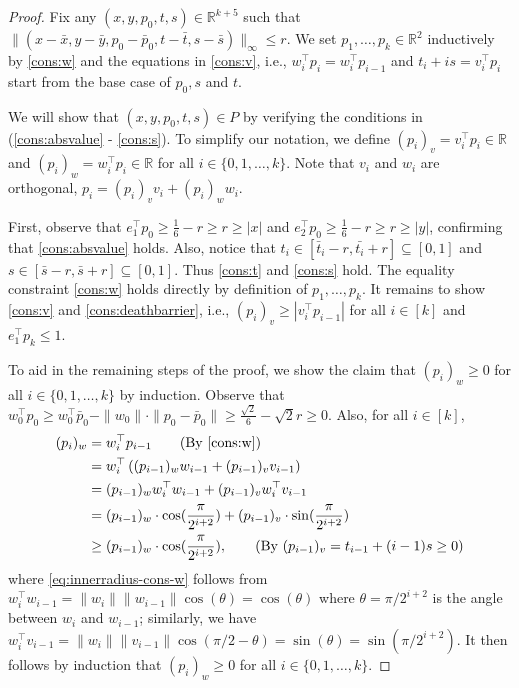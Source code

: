 \documentclass{article}\usepackage[a4paper,margin=20mm]{geometry}
\newcommand{\R}{\mathbb R}
\renewcommand{\subset}{\subseteq}
\begin{document}
\begin{proof}
    Fix any $(x, y, p_0, t, s) \in \R^{k + 5}$ such that $\|(x - \bar{x}, y - \bar{y}, p_0 - \bar{p}_0, t - \bar{t}, s - \bar{s})\|_\infty \leq r$. 
    We set $p_1, \ldots, p_k \in \R^2$ inductively by \eqref{cons:w} and the equations in \eqref{cons:v}, i.e.,
    $w_i^\top p_i = w_i^\top p_{i-1} $ and $t_i + is = v_i^\top p_i $ start from the base case of $p_0, s$ and $t$. 
    
    We will show that $(x, y, p_0, t, s) \in P$ by verifying the conditions in (\ref{cons:absvalue} - \ref{cons:s}).
    To simplify our notation, we define $(p_i)_v = v_i^\top p_i \in \R$ and $(p_i)_w = w_i^\top p_i \in \R$ for all $i \in \{0, 1, \ldots, k\}$. Note that $v_i$ and $w_i$ are orthogonal, $p_i = (p_i)_v v_i + (p_i)_w w_i$.
    
    First, observe that $e_1^\top p_0 \geq \frac{1}{6} - r \geq r \geq |x|$ and $e_2^\top p_0 \geq \frac{1}{6} - r \geq r \geq |y|$, confirming that \eqref{cons:absvalue} holds.
    Also, notice that $t_i \in [\bar{t}_i - r, \bar{t_i} + r] \subset [0, 1]$
     and $s \in [\bar{s} - r, \bar{s} + r] \subset [0, 1]$. Thus \eqref{cons:t} and \eqref{cons:s} hold. 
    The equality constraint \eqref{cons:w} holds directly by definition of $p_1,\ldots, p_k$.
    It remains to show \eqref{cons:v} and \eqref{cons:deathbarrier}, i.e., $ (p_i)_v \geq |v_i^\top p_{i-1}|$ for all $i \in [k]$ and $e_1^\top p_k \leq 1$.
    
    To aid in the remaining steps of the proof, we show the claim that $(p_i)_w \geq 0$
    for all $i \in \{0,1,\ldots,k\}$ by induction. Observe that
    $w_0^\top p_0 \geq w_0^\top \bar{p}_0 - \|w_0\|\cdot\|p_0 - \bar p_0\| \geq \frac{\sqrt{2}}{6} - \sqrt 2 r \geq 0$.
    Also, for all $i \in [k]$,
    \begin{align}
        (p_i)_w &= w_i^\top p_{i-1} \tag{By \eqref{cons:w}} \nonumber \\
        &= w_i^\top \left( (p_{i-1})_w w_{i-1} + (p_{i-1})_v v_{i-1} \right) \nonumber \\
        &= (p_{i-1})_w w_i^\top w_{i-1} + (p_{i-1})_v w_i^\top v_{i-1} \nonumber \\
        &= (p_{i-1})_w \cdot \cos(\frac{\pi}{2^{i+2}}) + (p_{i-1})_v \cdot \sin(\frac{\pi}{2^{i+2}}) \label{eq:innerradius-cons-w} \\
        &\geq (p_{i-1})_w \cdot \cos(\frac{\pi}{2^{i+2}}), \tag{By $(p_{i-1})_v = t_{i-1} + (i-1)s \geq 0$} \nonumber
    \end{align}
    where \eqref{eq:innerradius-cons-w} follows from $w_{i}^\top w_{i-1} = \|w_{i}\|\|w_{i-1}\| \cos(\theta) = \cos(\theta)$ where $\theta = \pi / 2^{i+2}$ is the angle between $w_i$ and $w_{i-1}$; similarly,  we have $w_{i}^\top v_{i-1} = \|w_{i}\|\|v_{i-1}\| \cos(\pi/2 - \theta) = \sin(\theta) = \sin (\pi / 2^{i+2})$. 
    It then follows by induction that $(p_i)_w \geq 0$ for all $i \in \{0,1,\ldots,k\}$.
    

\end{proof}
\end{document}
